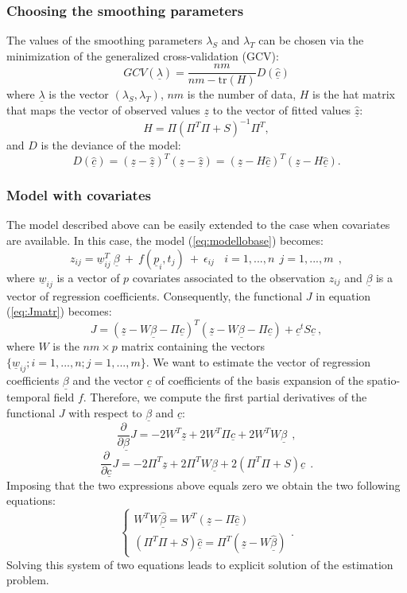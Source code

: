 \documentclass[a4paper,11pt,twoside,openright]{book}							%
\begin{document}
\subsubsection*{Choosing the smoothing parameters}

The values of the smoothing parameters $\lambda_S$ and $\lambda_T$ can be chosen via the minimization of the generalized cross-validation (GCV):
$$ GCV(\underline \lambda) =\frac{nm}{nm-\text{tr}(H)}  D(\hat  {\underline c}) $$
where $\underline \lambda$ is the vector $ (\lambda_S,\lambda_T) $, $nm$ is the number of data, $H$ is the hat matrix that maps the vector of observed values $\underline z$ to the vector of fitted values $\hat  {\underline z}$:
$$ H = \Pi (\Pi^T \Pi + S)^{-1}\Pi^T ,$$
and $D$ is the deviance of the model:
$$  D(\hat  {\underline c}) = (\underline z - \hat  {\underline z})^T(\underline z - \hat  {\underline z}) = (\underline z - H \hat  {\underline c})^T(\underline z - H \hat  {\underline c}).$$


\subsubsection*{Model with covariates}

The model described above can be easily extended to the case when covariates are available.
In this case, the model (\ref{eq:modellobase}) becomes:
$$ z_{ij}= \underline w_{ij}^T\  \underline \beta   \ + \  f(\underline p_i,t_j)\ +\ \epsilon_{ij}\ \ \ \ i = 1,...,n\ \ j=1,...,m \ \ ,$$
where $\underline w_{ij}$ is a vector of $p$ covariates associated to the observation $z_{ij}$ and $\underline \beta$ is a vector of regression coefficients.
Consequently, the functional $J$ in equation (\ref{eq:Jmatr}) becomes:
$$ J = (\underline z - W \underline \beta - \Pi \underline c)^T (\underline z - W \underline \beta - \Pi \underline c) + \underline c^t S \underline c  \ ,$$
where $W$ is the $nm \times p$ matrix containing the vectors $ \{\underline w_{ij}; i=1,...,n;j=1,...,m\}$.
We want to estimate the vector of regression coefficients $\underline \beta$ and the vector $\underline c$ of coefficients of the basis expansion of the spatio-temporal field $f$. Therefore, we compute the first partial derivatives of the functional $J$ with respect to $\underline \beta$ and $\underline c$:
$$
\frac{\partial}{\partial \underline \beta}J= -2W^T \underline z + 2W^T \Pi \underline c + 2 W^TW \underline \beta \ \ ,
$$
$$
\frac{\partial}{\partial \underline c}J= -2 \Pi^T \underline z + 2 \Pi^T W \underline \beta + 2(\Pi^T \Pi + S) \underline c \ \ .
$$
Imposing that the two expressions above equals zero we obtain the two following equations:
$$
\begin{cases}
W^TW \hat{\underline \beta} = W^T(\underline z - \Pi \hat{\underline c})  \\
(\Pi^T \Pi + S) \hat{\underline c}=\Pi^T(\underline z -W \hat{\underline \beta})
\end{cases}.
$$
Solving this system of two equations leads to explicit solution of the estimation problem.
\end{document}
